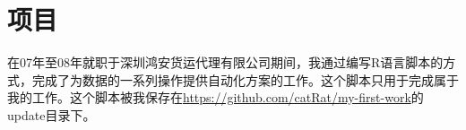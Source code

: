 \section{项目}
在07年至08年就职于深圳鸿安货运代理有限公司期间，我通过编写R语言脚本的方式，完成了为数据的一系列操作提供自动化方案的工作。这个脚本只用于完成属于我的工作。这个脚本被我保存在\url{https://github.com/catRat/my-first-work}的update目录下。

